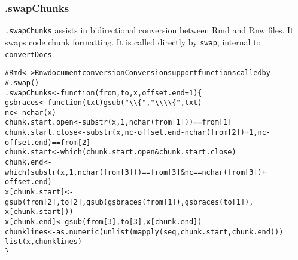 \documentclass{article}\usepackage[]{graphicx}\usepackage[]{color}
\makeatletter
\newcommand{\hlnum}[1]{\textcolor[rgb]{0.863,0.196,0.184}{#1}}%
\newcommand{\hlstr}[1]{\textcolor[rgb]{0.863,0.196,0.184}{#1}}%
\newcommand{\hlcom}[1]{\textcolor[rgb]{0.345,0.431,0.459}{#1}}%
\newcommand{\hlopt}[1]{\textcolor[rgb]{0.576,0.631,0.631}{#1}}%
\newcommand{\hlstd}[1]{\textcolor[rgb]{0.514,0.58,0.588}{#1}}%
\newcommand{\hlkwa}[1]{\textcolor[rgb]{0.796,0.294,0.086}{#1}}%
\newcommand{\hlkwb}[1]{\textcolor[rgb]{0.522,0.6,0}{#1}}%
\newcommand{\hlkwc}[1]{\textcolor[rgb]{0.796,0.294,0.086}{#1}}%
\newcommand{\hlkwd}[1]{\textcolor[rgb]{0.576,0.631,0.631}{#1}}%
\newenvironment{kframe}{%
 \def\at@end@of@kframe{}%
 \ifinner\ifhmode%
  \def\at@end@of@kframe{\end{minipage}}%
  \begin{minipage}{\columnwidth}%
 \fi\fi%
 \def\FrameCommand##1{\hskip\@totalleftmargin \hskip-\fboxsep
 \colorbox{shadecolor}{##1}\hskip-\fboxsep
     \hskip-\linewidth \hskip-\@totalleftmargin \hskip\columnwidth}%
 \MakeFramed {\advance\hsize-\width
   \@totalleftmargin\z@ \linewidth\hsize
   \@setminipage}}%
 {\par\unskip\endMakeFramed%
 \at@end@of@kframe}
\newenvironment{knitrout}{}{} %
\makeatother
\begin{document}
\subsubsection{.swapChunks}
\texttt{.swapChunks} assists in bidirectional conversion between Rmd and Rnw files.
It swaps code chunk formatting.
It is called directly by \texttt{swap}, internal to \texttt{convertDocs}.


\begin{knitrout}
\color{fgcolor}\begin{kframe}
\begin{alltt}
\hlcom{# Rmd <-> Rnw document conversion Conversion support functions called by}
\hlcom{# .swap()}
\hlstd{.swapChunks} \hlkwb{<-} \hlkwa{function}\hlstd{(}\hlkwc{from}\hlstd{,} \hlkwc{to}\hlstd{,} \hlkwc{x}\hlstd{,} \hlkwc{offset.end} \hlstd{=} \hlnum{1}\hlstd{) \{}
    \hlstd{gsbraces} \hlkwb{<-} \hlkwa{function}\hlstd{(}\hlkwc{txt}\hlstd{)} \hlkwd{gsub}\hlstd{(}\hlstr{"\textbackslash{}\textbackslash{}\{"}\hlstd{,} \hlstr{"\textbackslash{}\textbackslash{}\textbackslash{}\textbackslash{}\{"}\hlstd{, txt)}
    \hlstd{nc} \hlkwb{<-} \hlkwd{nchar}\hlstd{(x)}
    \hlstd{chunk.start.open} \hlkwb{<-} \hlkwd{substr}\hlstd{(x,} \hlnum{1}\hlstd{,} \hlkwd{nchar}\hlstd{(from[}\hlnum{1}\hlstd{]))} \hlopt{==} \hlstd{from[}\hlnum{1}\hlstd{]}
    \hlstd{chunk.start.close} \hlkwb{<-} \hlkwd{substr}\hlstd{(x, nc} \hlopt{-} \hlstd{offset.end} \hlopt{-} \hlkwd{nchar}\hlstd{(from[}\hlnum{2}\hlstd{])} \hlopt{+} \hlnum{1}\hlstd{, nc} \hlopt{-}
        \hlstd{offset.end)} \hlopt{==} \hlstd{from[}\hlnum{2}\hlstd{]}
    \hlstd{chunk.start} \hlkwb{<-} \hlkwd{which}\hlstd{(chunk.start.open} \hlopt{&} \hlstd{chunk.start.close)}
    \hlstd{chunk.end} \hlkwb{<-} \hlkwd{which}\hlstd{(}\hlkwd{substr}\hlstd{(x,} \hlnum{1}\hlstd{,} \hlkwd{nchar}\hlstd{(from[}\hlnum{3}\hlstd{]))} \hlopt{==} \hlstd{from[}\hlnum{3}\hlstd{]} \hlopt{&} \hlstd{nc} \hlopt{==} \hlkwd{nchar}\hlstd{(from[}\hlnum{3}\hlstd{])} \hlopt{+}
        \hlstd{offset.end)}
    \hlstd{x[chunk.start]} \hlkwb{<-} \hlkwd{gsub}\hlstd{(from[}\hlnum{2}\hlstd{], to[}\hlnum{2}\hlstd{],} \hlkwd{gsub}\hlstd{(}\hlkwd{gsbraces}\hlstd{(from[}\hlnum{1}\hlstd{]),} \hlkwd{gsbraces}\hlstd{(to[}\hlnum{1}\hlstd{]),}
        \hlstd{x[chunk.start]))}
    \hlstd{x[chunk.end]} \hlkwb{<-} \hlkwd{gsub}\hlstd{(from[}\hlnum{3}\hlstd{], to[}\hlnum{3}\hlstd{], x[chunk.end])}
    \hlstd{chunklines} \hlkwb{<-} \hlkwd{as.numeric}\hlstd{(}\hlkwd{unlist}\hlstd{(}\hlkwd{mapply}\hlstd{(seq, chunk.start, chunk.end)))}
    \hlkwd{list}\hlstd{(x, chunklines)}
\hlstd{\}}
\end{alltt}
\end{kframe}
\end{knitrout}
\end{document}
